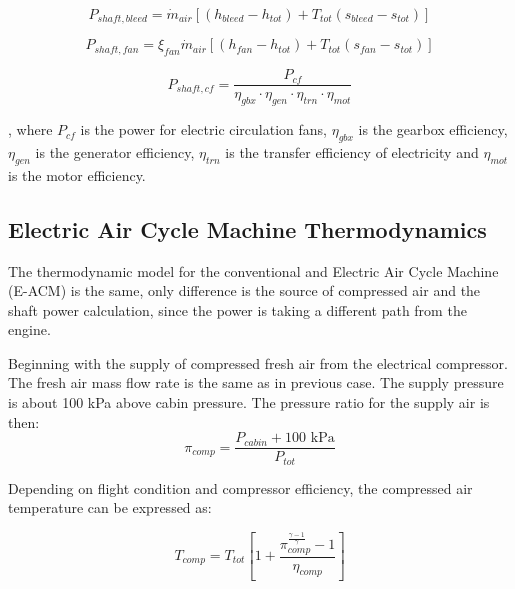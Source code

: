 \documentclass[english]{kththesis}
\begin{document}
\begin{equation}
P_{shaft,bleed} = \dot{m}_{air}[(h_{bleed}-h_{tot})+T_{tot}(s_{bleed}-s_{tot})]
\end{equation}

\begin{equation}
P_{shaft,fan} = \xi_{fan}\dot{m}_{air}[(h_{fan}-h_{tot})+T_{tot}(s_{fan}-s_{tot})]
\end{equation}

\begin{equation}
\label{eq:cfShaftPower}
P_{shaft,cf} = \frac{P_{cf}}{\eta_{gbx}\cdot\eta_{gen}\cdot\eta_{trn}\cdot\eta_{mot}}
\end{equation}

, where $P_{cf}$ is the power for electric circulation fans, $\eta_{gbx}$ is the gearbox efficiency, $\eta_{gen}$ is the generator efficiency, $\eta_{trn}$ is the transfer efficiency of electricity and $\eta_{mot}$ is the motor efficiency.


\subsection{Electric Air Cycle Machine Thermodynamics}
\label{subsec:EACMThermodynamics}

The thermodynamic model for the conventional and Electric Air Cycle Machine (E-ACM) is the same, only difference is the source of compressed air and the shaft power calculation, since the power is taking a different path from the engine.

Beginning with the supply of compressed fresh air from the electrical compressor. The fresh air mass flow rate is the same as in previous case. The supply pressure is about 100 kPa above cabin pressure. The pressure ratio for the supply air is then:
\begin{equation}
\pi_{comp} = \frac{P_{cabin}+100 \text{ kPa}}{P_{tot}}
\end{equation}

Depending on flight condition and compressor efficiency, the compressed air temperature can be expressed as:

\begin{equation}
\label{eq:Tcomp}
T_{comp} = T_{tot} \left[ 1+\frac{\pi_{comp}^{\frac{\gamma-1}{\gamma}} - 1}{\eta_{comp}} \right]
\end{equation}
\end{document}
